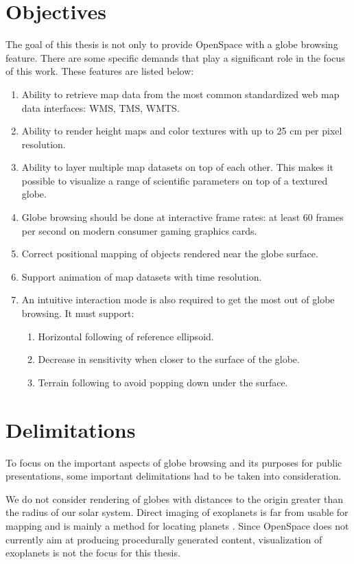\section{Objectives}

The goal of this thesis is not only to provide OpenSpace with a globe browsing feature. There are some specific demands that play a significant role in the focus of this work. These features are listed below:

\begin{enumerate}
    \item Ability to retrieve map data from the most common standardized web map data interfaces: WMS, TMS, WMTS.
    \item Ability to render height maps and color textures with up to 25 cm per pixel resolution.
    \item Ability to layer multiple map datasets on top of each other. This makes it possible to visualize a range of scientific parameters on top of a textured globe.
    \item Globe browsing should be done at interactive frame rates: at least 60 frames per second on modern consumer gaming graphics cards.
    \item Correct positional mapping of objects rendered near the globe surface.
    \item Support animation of map datasets with time resolution.
    \item An intuitive interaction mode is also required to get the most out of globe browsing. It must support:
	\begin{enumerate}
    		\item Horizontal following of reference ellipsoid.
		\item Decrease in sensitivity when closer to the surface of the globe.
		\item Terrain following to avoid popping down under the surface.
	\end{enumerate}
\end{enumerate}

\section{Delimitations}

To focus on the important aspects of globe browsing and its purposes for public presentations, some important delimitations had to be taken into consideration.

We do not consider rendering of globes with distances to the origin greater than the radius of our solar system. Direct imaging of exoplanets is far from usable for mapping and is mainly a method for locating planets \cite{exoplanets}. Since OpenSpace does not currently aim at producing procedurally generated content, visualization of exoplanets is not the focus for this thesis.

